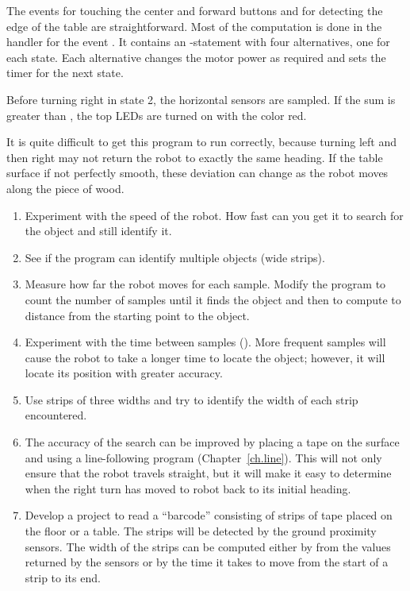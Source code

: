 
The events for touching the center and forward buttons and for detecting
the edge of the table are straightforward. Most of the computation is done
in the handler for the event . It contains an -statement
with four alternatives, one for each state. Each alternative changes the
motor power as required and sets the timer for the next state.

Before turning right in state 2, the horizontal sensors are sampled.
If the sum is greater than , the top LEDs are turned on
with the color red.



It is quite difficult to get this program to run correctly,
because turning left and then right may not return the robot
to exactly the same heading. If the table surface if not perfectly
smooth, these deviation can change as the robot moves along the piece of wood.


\begin{enumerate}

\item Experiment with the speed of the robot. How fast can you get it to
search for the object and still identify it.

\item See if the program can identify multiple objects (wide strips).

\item Measure how far the robot moves for each sample.
Modify the program to count the number of samples until it finds the object
and then to compute to distance from the starting point to the object.

\item Experiment with the time between samples ().
More frequent samples will cause the robot to take a longer time
to locate the object; however, it will locate its position
with greater accuracy.

\item Use strips of three widths and try to identify the width of
each strip encountered.

\item The accuracy of the search can be improved by
placing a tape on the surface and using a line-following program
(Chapter~\ref{ch.line}). This will not only ensure that the robot travels
straight, but it will make it easy to determine when the right turn
has moved to robot back to its initial heading.

\item Develop a project to read a ``barcode'' consisting of strips
of tape placed on the floor or a table. The strips will be detected
by the ground proximity sensors. The width of the strips can be computed
either by from the values returned by the sensors or by the time it takes
to move from the start of a strip to its end.

\end{enumerate}
